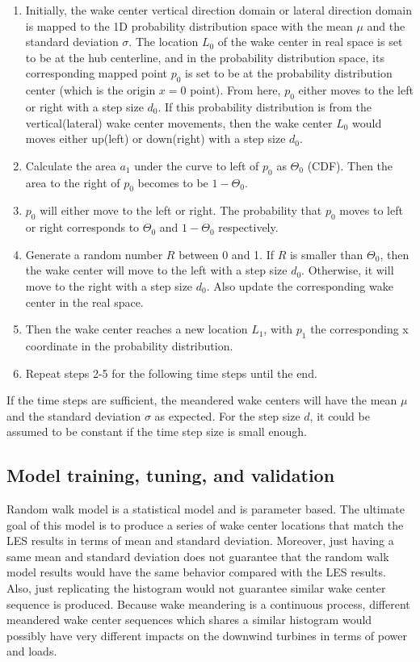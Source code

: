 \documentclass{umthesis}
\begin{document}
\begin{enumerate}
  \item Initially, the wake center vertical direction domain or lateral direction domain is mapped to the 1D probability distribution space with the mean $\mu$ and the standard deviation $\sigma$. The location $L_0$ of the wake center in real space is set to be at the hub centerline, and in the probability distribution space, its corresponding mapped point $p_0$ is set to be at the probability distribution center (which is the origin $x=0$ point). From here, $p_0$ either moves to the left or right with a step size $d_0$. If this probability distribution is from the vertical(lateral) wake center movements, then the wake center $L_0$ would moves either up(left) or down(right) with a step size $d_0$.
  \item Calculate the area $a_1$ under the curve to left of $p_0$ as $\Theta_0$ (CDF). Then the area to the right of $p_0$ becomes to be $1-\Theta_0$.
  \item $p_0$ will either move to the left or right. The probability that $p_0$ moves to left or right corresponds to $\Theta_0$ and $1-\Theta_0$ respectively.
  \item Generate a random number $R$ between 0 and 1. If $R$ is smaller than $\Theta_0$, then the wake center will move to the left with a step size $d_0$. Otherwise, it will move to the right with a step size $d_0$. Also update the corresponding wake center in the real space.
  \item Then the wake center reaches a new location $L_1$, with $p_1$ the corresponding x coordinate in the probability distribution.
  \item Repeat steps 2-5 for the following time steps until the end.      
\end{enumerate}

If the time steps are sufficient, the meandered wake centers will have the mean $\mu$ and the standard deviation $\sigma$ as expected. For the step size $d$, it could be assumed to be constant if the time step size is small enough. 

\subsection{Model training, tuning, and validation}
Random walk model is a statistical model and is parameter based. The ultimate goal of this model is to produce a series of wake center locations that match the LES results in terms of mean and standard deviation. Moreover, just having a same mean and standard deviation does not guarantee that the random walk model results would have the same behavior compared with the LES results. Also, just replicating the histogram would not guarantee similar wake center sequence is produced. Because wake meandering is a continuous process, different meandered wake center sequences which shares a similar histogram would possibly have very different impacts on the downwind turbines in terms of power and loads.
\end{document}
